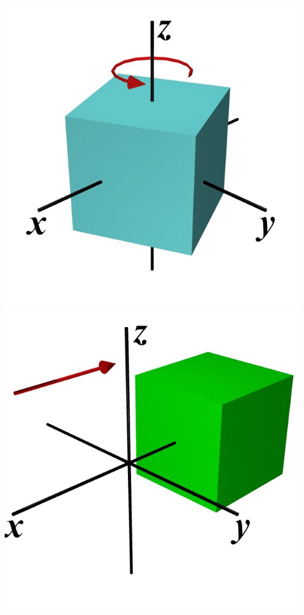 \documentclass[crop=false]{standalone}
\begin{document}
\vspace{-0.015\linewidth}
\begin{center}
  \includegraphics[width=0.2\linewidth]{thesis/appendices/import/imgs/rotation.jpeg}%
  \includegraphics[width=0.2\linewidth]{thesis/appendices/import/imgs/translation.jpeg}
  \label{fig:rot_trans}
\end{center}
\vspace{-0.01\linewidth}
\end{document}
